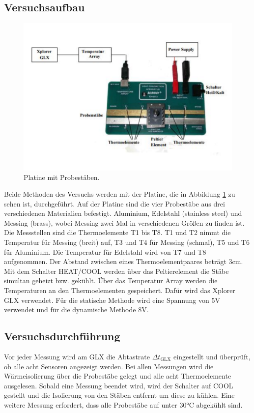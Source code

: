 \subsection{Versuchsaufbau}
\label{subsec:Versuchsaufbau}
\begin{figure}
    \centering
    \includegraphics[width=\textwidth]{platine.pdf}
    \caption{Platine mit Probestäben.\cite{anleitung}}
    \label{fig:platine}
\end{figure}
Beide Methoden des Versuchs werden mit der Platine, die in Abbildung \ref{fig:platine} zu sehen ist, durchgeführt.
Auf der Platine sind die vier Probestäbe aus drei verschiedenen Materialien befestigt.
Aluminium, Edelstahl (stainless steel) und Messing (brass), wobei Messing zwei Mal in verschiedenen Größen zu finden ist.
Die Messstellen sind die Thermoelemente T1 bis T8.
T1 und T2 nimmt die Temperatur für Messing (breit) auf, T3 und T4 für Messing (schmal), T5 und T6 für Aluminium.
Die Temperatur für Edelstahl wird von T7 und T8 aufgenommen.
Der Abstand zwischen eines Thermoelementpaares beträgt $3\si{\centi\meter}$.
Mit dem Schalter HEAT/COOL werden über das Peltierelement die Stäbe simultan geheizt bzw. gekühlt.
Über das Temperatur Array werden die Temperaturen an den Thermoelementen gespeichert.
Dafür wird das Xplorer GLX verwendet.
Für die statische Methode wird eine Spannung von $5\si{\volt}$ verwendet und für die dynamische Methode $8\si{\volt}$.

\subsection{Versuchsdurchführung}
\label{subsec:Versuchsdurchführung}
Vor jeder Messung wird am GLX die Abtastrate $\Delta t_\text{GLX}$ eingestellt und überprüft, ob alle acht Sensoren angezeigt werden.
Bei allen Messungen wird die Wärmeisolierung über die Probestäbe gelegt und alle acht Thermoelemente ausgelesen.
Sobald eine Messung beendet wird, wird der Schalter auf COOL gestellt und die Isolierung von den Stäben entfernt um diese zu kühlen.
Eine weitere Messung erfordert, dass alle Probestäbe auf unter $30\si{\celsius}$ abgekühlt sind.
